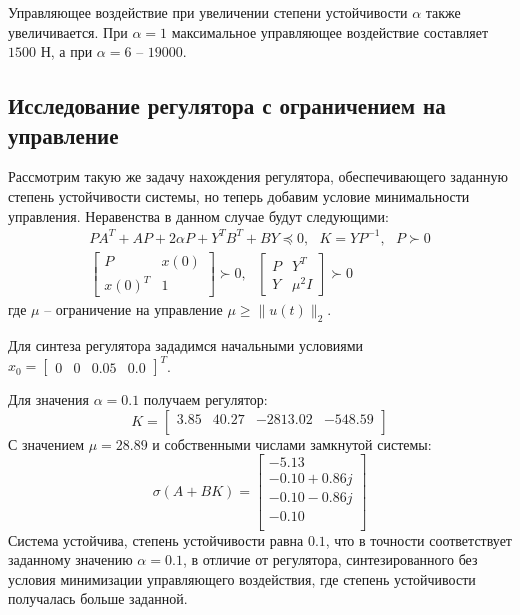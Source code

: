 Управляющее воздействие при увеличении степени устойчивости $\alpha$ также увеличивается. При $\alpha = 1$ максимальное
управляющее воздействие составляет $1500$ Н, а при $\alpha = 6$ -- $19000$. 

\subsection{Исследование регулятора с ограничением на управление} 
Рассмотрим такую же задачу нахождения регулятора, обеспечивающего заданную степень устойчивости 
системы, но теперь добавим условие минимальности управления. Неравенства в данном случае 
будут следующими:
\begin{equation}
    \begin{array}{cc}
        PA^T + AP + 2\alpha P + Y^T B^T + BY \preceq 0, ~~~ K = Y P^{-1}, ~~~ P \succ 0 \\ 
        \begin{bmatrix}
            P & x(0) \\
            x(0)^T & 1
        \end{bmatrix} \succ 0, ~~~ \begin{bmatrix}
            P & Y^T \\
            Y & \mu^2I
        \end{bmatrix} \succ 0
    \end{array}
\end{equation} 
где $\mu$ -- ограничение на управление $\mu \ge \|u(t)\|_2$.

Для синтеза регулятора зададимся начальными условиями $x_0 = \begin{bmatrix} 0 & 0 & 0.05 & 0.0 \end{bmatrix}^T$. 

Для значения $\alpha = 0.1$ получаем регулятор:
\begin{equation}
    K = \begin{bmatrix}
    3.85  & 40.27  & -2813.02  & -548.59 \\ 
    \end{bmatrix}
\end{equation}
С значением $\mu = 28.89$ и собственными числами замкнутой системы:
\begin{equation}
     \sigma(A + BK) = \begin{bmatrix}
        -5.13 \\ 
        -0.10 + 0.86j \\ 
        -0.10 - 0.86j \\ 
        -0.10 \\ 
    \end{bmatrix}
\end{equation}  
Система устойчива, степень устойчивости равна $0.1$, что в точности соответствует заданному значению $\alpha = 0.1$,
в отличие от регулятора, синтезированного без условия минимизации управляющего воздействия, где степень устойчивости 
получалась больше заданной.

